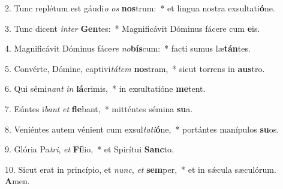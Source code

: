 2. Tunc replétum est gáudi\textit{o} \textit{os} \textbf{nos}trum:~*  et lingua nostra exsultati\textbf{ó}ne.\

3. Tunc dicent \textit{in}\textit{ter} \textbf{Gen}tes:~*  Magnificávit Dóminus fácere cum \textbf{e}is.\

4. Magnificávit Dóminus fáce\textit{re} \textit{no}\textbf{bís}cum:~*  facti sumus læ\textbf{tán}tes.\

5. Convérte, Dómine, captivi\textit{tá}\textit{tem} \textbf{nos}tram,~*  sicut torrens in \textbf{aus}tro.\

6. Qui sémi\textit{nant} \textit{in} \textbf{lá}crimis,~*  in exsultatióne \textbf{me}tent.\

7. Eúntes i\textit{bant} \textit{et} \textbf{fle}bant,~*  mitténtes sémina \textbf{su}a.\

8. Veniéntes autem vénient cum exsul\textit{ta}\textit{ti}\textbf{ó}ne,~*  portántes manípulos \textbf{su}os.\

9. Glória Pa\textit{tri}, \textit{et} \textbf{Fí}lio,~*  et Spirítui \textbf{Sanc}to.\

10. Sicut erat in princípio, et \textit{nunc}, \textit{et} \textbf{sem}per,~*  et in sǽcula sæculórum. \textbf{A}men.\

